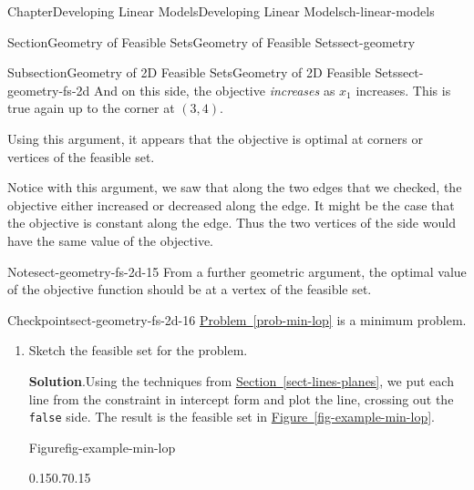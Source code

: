 \documentclass[oneside,10pt,]{book}
\newcommand{\blocktitlefont}{\relax}
\newcommand{\xreffont}{\relax}
\newcommand{\mono}[1]{\texttt{#1}}
\numberwithin{equation}{section}
\begin{document}
\begin{chapterptx}{Chapter}{Developing Linear Models}{}{Developing Linear Models}{}{}{ch-linear-models}
\begin{sectionptx}{Section}{Geometry of Feasible Sets}{}{Geometry of Feasible Sets}{}{}{sect-geometry}
\begin{subsectionptx}{Subsection}{Geometry of 2D Feasible Sets}{}{Geometry of 2D Feasible Sets}{}{}{sect-geometry-fs-2d}
And on this side, the objective \emph{increases} as \(x_1\) increases. This is true again up to the corner at \((3,4)\).%
\par
Using this argument, it appears that the objective is optimal at corners or vertices of the feasible set.%
\par
Notice with this argument, we saw that along the two edges that we checked, the objective either increased or decreased along the edge. It might be the case that the objective is constant along the edge. Thus the two vertices of the side would have the same value of the objective.%
\begin{note}{Note}{}{sect-geometry-fs-2d-15}%
From a further geometric argument, the optimal value of the objective function should be at a vertex of the feasible set.%
\end{note}
\begin{inlineexercise}{Checkpoint}{}{sect-geometry-fs-2d-16}%
\hyperref[prob-min-lop]{Problem~{\xreffont\ref{prob-min-lop}}} is a minimum problem.%
\begin{enumerate}[font=\bfseries,label=(\alph*),ref=\alph*]%
\item{}Sketch the feasible set for the problem.%
\par\smallskip%
\noindent\textbf{\blocktitlefont Solution}.\hypertarget{sect-geometry-fs-2d-16-2-2}{}\quad{}Using the techniques from \hyperref[sect-lines-planes]{Section~{\xreffont\ref{sect-lines-planes}}}, we put each line from the constraint in intercept form and plot the line, crossing out the \mono{false} side.  The result is the feasible set in \hyperref[fig-example-min-lop]{Figure~{\xreffont\ref{fig-example-min-lop}}}.%
\begin{figureptx}{Figure}{}{fig-example-min-lop}{}%
\begin{image}{0.15}{0.7}{0.15}{}%
\end{image}
\end{figureptx}
\end{enumerate}
\end{inlineexercise}
\end{subsectionptx}
\end{sectionptx}
\end{chapterptx}
\end{document}
